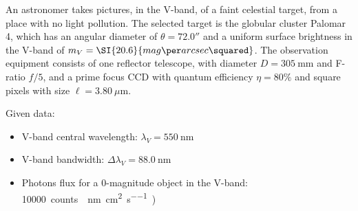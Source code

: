 An astronomer takes pictures, in the V-band, of a faint celestial target, from a place with no light pollution. The selected target is the globular cluster Palomar 4, which has an angular diameter of $\theta = \ang{;;72.0}$ and a uniform surface brightness in the V-band of $m_V = \SI{20.6}{mag \per arcsec\squared}$. The observation equipment consists of one {reflector} telescope, with diameter $D = \SI{305}{\milli\m}$ and F-ratio {$f/5$}, and a prime focus CCD with quantum efficiency $\eta = 80\%$ and {square pixels with} size $\ell = \SI{3.80}{\mu\m}$.

Given data:
\begin{itemize}
    \item V-band central wavelength: $\lambda_V = \SI{550}{\nano\m}$
    \item V-band bandwidth: $\Delta \lambda_V = \SI{88.0}{\nano\m}$
    \item Photons flux for a 0-magnitude object in the V-band: \SI{10000}{ counts \per \nano\m \per \centi \m \squared \per \s)}
\end{itemize}

